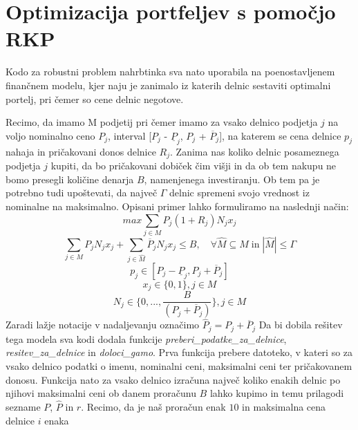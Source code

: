 \documentclass[a4paper,12pt]{article}
\theoremstyle{definition}
\begin{document}
\section{Optimizacija portfeljev s pomočjo RKP}
\medskip
Kodo za robustni problem nahrbtinka sva nato uporabila na poenostavljenem finančnem modelu,
kjer naju je zanimalo iz katerih delnic sestaviti optimalni portelj, pri čemer so cene delnic
negotove. 
\par
Recimo, da imamo M podjetij pri čemer imamo za vsako delnico podjetja $j$ na voljo nominalno ceno $P_j$,
interval [$P_j$ - $\underline{P}_{j}$, $P_j$ + $\overline{P}_{j}$], na katerem se cena delnice $p_j$  
nahaja in pričakovani donos delnice $R_j$. Zanima 
nas koliko delnic posameznega podjetja $j$ kupiti, da bo pričakovani dobiček čim višji in da ob tem nakupu
ne bomo presegli količine denarja $B$, namenjenega investiranju. Ob tem pa je potrebno tudi upoštevati,
da največ $\Gamma$ delnic spremeni svojo vrednost iz nominalne na maksimalno. Opisani primer lahko
formuliramo na naslednji način:
\begin{equation}
\tag*{}
     max \sum_{j \in M} P_{j}(1 + R_{j})N_{j}x_{j}
\end{equation}
\begin{equation}
\tag*{}
    \sum_{j \in M}P_{j}N_{j}x_{j} + \sum_{j \in \hat{M}}\overline{P}_{j}N_{j}x_{j} \leq B,\quad \forall \hat{M} \subseteq M \; \text{in}\; |\hat{M}| \leq \Gamma    
\end{equation}
\begin{equation}
\tag*{}
    p_{j} \in [P_{j} - \underline{P}_{j}, P_{j} + \overline{P}_{j}]
\end{equation}
\begin{equation}
\tag*{}
    x_{j} \in \{0,1\}, j \in M
\end{equation}
\begin{equation}
    \tag*{}
    N_j \in \{0, ..., \frac{B}{(P_j + \overline{P}_{j})} \}, j \in M
\end{equation}
Zaradi lažje notacije v nadaljevanju označimo $\hat{P}_j = P_j + \overline{P}_j$
Da bi dobila rešitev tega modela sva kodi dodala
funkcije \textit{preberi\_podatke\_za\_delnice},
\textit{resitev\_za\_delnice} in \textit{doloci\_gamo}. Prva funkcija prebere
datoteko, v kateri so za vsako delnico podatki o imenu,
nominalni ceni, maksimalni ceni ter pričakovanem donosu.
Funkcija nato za vsako delnico izračuna največ koliko enakih
delnic po njihovi maksimalni ceni ob danem proračunu $B$ lahko kupimo in temu prilagodi sezname $P$,
$\hat{P}$ in $r$. Recimo, da je naš proračun enak $10$ in maksimalna cena delnice $i$ enaka
\end{document}
